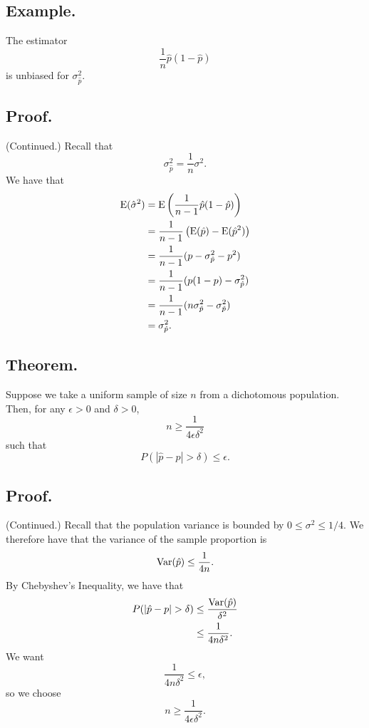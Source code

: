 \documentclass[titlepage]{article}
\begin{document}
\subsection{Example.} The estimator 
$$\frac{1}{n}\hat{p}(1-\hat{p})$$
is unbiased for $\sigma_{\hat{p}}^{2}$.

\subsection{Proof.} (Continued.) Recall that 
$$\sigma_{\hat{p}}^{2} = \frac{1}{n}\sigma^{2}.$$
We have that 
\begin{align*}
    \text{E}(\hat{\sigma}^{2}) &= \text{E}\left(\frac{1}{n-1}\hat{p}(1-\hat{p})\right) \\
                         &= \frac{1}{n-1}\left(\text{E}(\hat{p}) - \text{E}(\hat{p}^{2})\right) \\
                         &= \frac{1}{n-1}(p - \sigma_{\hat{p}}^{2} - p^{2}) \\
                         &= \frac{1}{n-1}(p(1-p) - \sigma_{\hat{p}}^{2}) \\
                         &= \frac{1}{n-1}(n\sigma_{\hat{p}}^{2} - \sigma_{\hat{p}}^{2}) \\
                         &= \sigma_{\hat{p}}^{2}.
\end{align*}

\subsection{Theorem.} Suppose we take a uniform sample of size $n$ from a dichotomous population. Then, for any $\epsilon > 0$ and $\delta > 0$, 
$$n \geq \frac{1}{4\epsilon\delta^{2}}$$
such that 
$$P(|\hat{p} - p| > \delta) \leq \epsilon.$$

\subsection{Proof.} (Continued.) Recall that the population variance is bounded by $0 \leq \sigma^{2} \leq 1/4$. We therefore have that the variance of the sample proportion is 
$$\text{Var}(\hat{p}) \leq \frac{1}{4n}.$$
By Chebyshev's Inequality, we have that 
\begin{align*}
    P(|\hat{p} - p| > \delta) &\leq \frac{\text{Var}(\hat{p})}{\delta^{2}} \\
                              &\leq \frac{1}{4n\delta^{2}}.
\end{align*}
We want 
$$\frac{1}{4n\delta^{2}} \leq \epsilon,$$
so we choose 
$$n \geq \frac{1}{4\epsilon\delta^{2}}.$$
\end{document}
